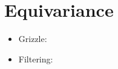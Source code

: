 
\chapter{Equivariance}


\begin{itemize}
  \item Grizzle: \cite{grizzle_structure_1985}
  \item Filtering: \cite{van_goor_equivariant_2020}
\end{itemize}

